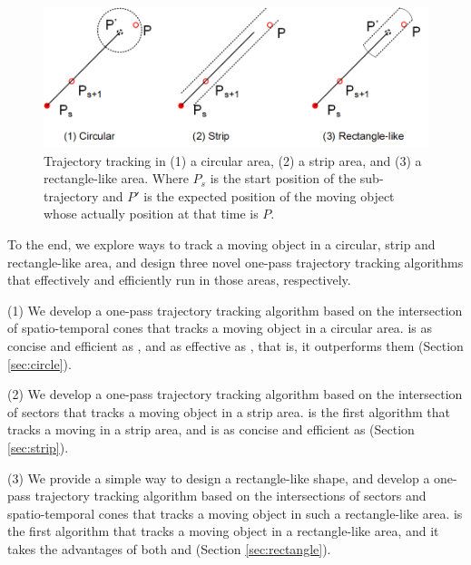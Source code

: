 \begin{figure}[tb!]
	\centering
	\includegraphics[scale=1.0]{Figures/Fig-Areas.png}\vspace{-1ex}
	\caption{\small  Trajectory tracking in (1) a circular area, (2) a strip area, and (3) a rectangle-like area. Where $P_s$ is the start position of the sub-trajectory and $P'$ is the expected position of the moving object whose actually position at that time is $P$.}
	\vspace{-1ex}
	\label{fig:areas}
\end{figure}

To the end, we explore ways to track a moving object in a circular, strip and rectangle-like area, and design three novel one-pass trajectory tracking algorithms that effectively and efficiently run in those areas, respectively. 

\ni (1) We develop a one-pass trajectory tracking algorithm \citt based on the intersection of spatio-temporal cones that tracks a moving object in a circular area. \citt is as concise and efficient as \ldrh, and as effective as \grts, that is, it outperforms them (Section \ref{sec:circle}).

\ni (2) We develop a one-pass trajectory tracking algorithm \sitt based on the intersection of sectors that tracks a moving object in a strip area. \sitt is the first algorithm that tracks a moving in a strip area, and is as concise and efficient as \citt (Section \ref{sec:strip}). %

\ni (3) We provide a simple way to design a rectangle-like shape, and develop a one-pass trajectory tracking algorithm \bitt based on the intersections of sectors and spatio-temporal cones that tracks a moving object in such a rectangle-like area. \bitt is the first algorithm that tracks a moving object in a rectangle-like area, and it takes the advantages of both \citt and \sitt (Section \ref{sec:rectangle}). 

